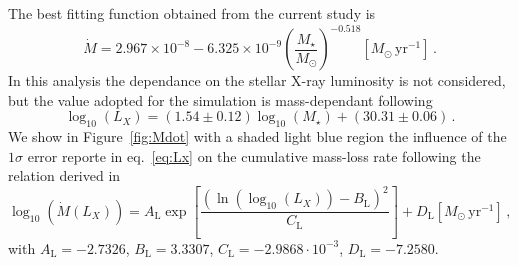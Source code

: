 \documentclass{aa}
\begin{document}
The best fitting function obtained from the current study is
\begin{equation}
  \dot{M} = 2.967\times10^{-8} - 6.325\times10^{-9} \left(\frac{M_\star}{M_\odot}\right)^{-0.518} [M_\odot\, \mathrm{yr}^{-1}]\,.
\end{equation}
In this analysis the dependance on the stellar X-ray luminosity is not considered, but the value adopted for the simulation is mass-dependant following 
\begin{equation}\label{eq:Lx}
	\log_{10}{(L_X)} = (1.54 \pm 0.12) \log_{10}{(M_\star)} + (30.31 \pm 0.06)\,.
\end{equation}
We show in Figure~\ref{fig:Mdot} with a shaded light blue region the influence of the $1 \sigma$ error reporte in eq.~\ref{eq:Lx} on the cumulative mass-loss rate following the relation derived in 
\begin{equation}\label{eq:MdotLx}
  \log_{10}(\dot{M}(L_X)) = A_\textrm{L} \exp{\left[\frac{(\ln{(\log_{10}(L_X))}-B_\textrm{L})^2}{C_\textrm{L}}\right]} + D_\textrm{L} [M_\odot\, \mathrm{yr}^{-1}]\,,
\end{equation}
with $A_\textrm{L} = -2.7326$, $B_\textrm{L} = 3.3307$, $C_\textrm{L} = -2.9868\cdot10^{-3}$, $D_\textrm{L} = -7.2580$.
\end{document}
